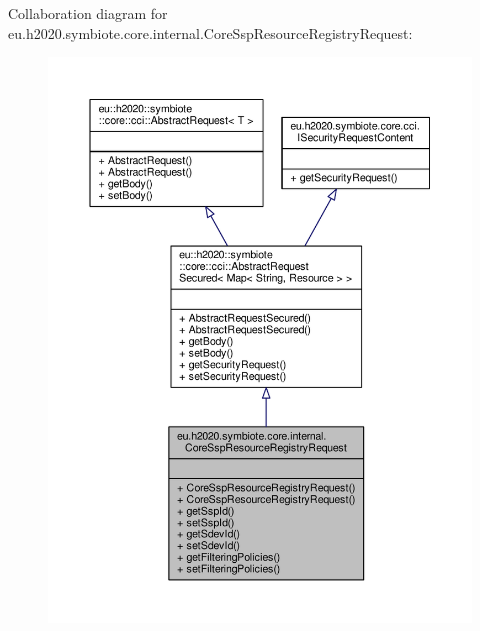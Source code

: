 Collaboration diagram for eu.\+h2020.\+symbiote.\+core.\+internal.\+Core\+Ssp\+Resource\+Registry\+Request\+:
\nopagebreak
\begin{figure}[H]
\begin{center}
\leavevmode
\includegraphics[width=350pt]{classeu_1_1h2020_1_1symbiote_1_1core_1_1internal_1_1CoreSspResourceRegistryRequest__coll__graph}
\end{center}
\end{figure}
